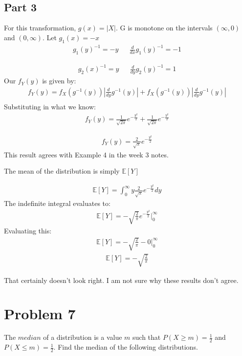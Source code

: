 \documentclass{article}
\begin{document}
\subsection*{Part 3}
For this transformation, $g(x) = |X|$. G is monotone on the intervals $(\infty,0)$ and $(0,\infty)$.
Let $g_{1}(x) = -x$
\begin{align*}
g_{1}(y)^{-1} = -y && \frac{d}{dx} g_{1}(y)^{-1} = -1
\end{align*}

\begin{align*}
g_{2}(x)^{-1} = y && \frac{d}{dy} g_{2}(y)^{-1} = 1
\end{align*}
Our $f_Y(y)$ is given by:
\begin{align*}
f_Y(y) = f_X(g^{-1}(y))|\frac{d}{dy}g^{-1}(y)| + f_X(g^{-1}(y))|\frac{d}{dy}g^{-1}(y)| \\
\end{align*}
Substituting in what we know:
\begin{align*}
f_Y(y) = \frac{1}{\sqrt{2\pi}} e^{-\frac{y^2}{2}} + \frac{1}{\sqrt{2\pi}} e^{-\frac{y^2}{2}}
\end{align*}

\begin{align*}
\boxed{f_Y(y) = \frac{2}{\sqrt{\pi}} e^{-\frac{y^2}{2}}}
\end{align*}
This result agrees with Example 4 in the week 3 notes.

The mean of the distribution is simply
$\mathbb{E}[{Y}]$

\begin{align*}
{\mathbb{E}[{Y}] = \int_0^{\infty} y \frac{2}{\sqrt{\pi}} e^{-\frac{y^2}{2}}} dy 
\end{align*}
The indefinite integral evaluates to:
\begin{align*}
\mathbb{E}[{Y}] = - \sqrt{\frac{2}{\pi}} e^{-\frac{y^2}{2}} |_0^{\infty}
\end{align*}
Evaluating this:
\begin{align*}
\mathbb{E}[{Y}] = - \sqrt{\frac{2}{\pi}} - 0 |_0^{\infty}
\end{align*}
\begin{align*}
\boxed{\mathbb{E}[{Y}] = - \sqrt{\frac{2}{\pi}}}
\end{align*}

That certainly doesn't look right. I am not sure why these results don't agree.

\clearpage
\section*{Problem 7}
The $median$ of a distribution is a value $m$ such that $P(X\geq m) = \frac{1}{2}$ and $P(X\leq m)=\frac{1}{2}$. Find the median of the following distributions.
\end{document}
